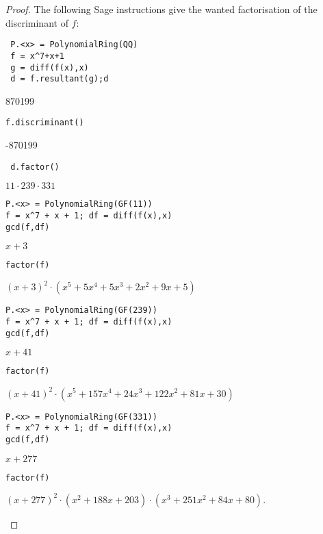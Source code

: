 \documentclass[11pt,a4paper]{article}
\begin{document}
\begin{proof}
The following Sage instructions give the wanted factorisation of the discriminant of $f$:
\begin{verbatim}
 P.<x> = PolynomialRing(QQ)
 f = x^7+x+1
 g = diff(f(x),x)
 d = f.resultant(g);d
\end{verbatim}
\begin{center}
870199
\end{center}
\begin{verbatim}
f.discriminant()
\end{verbatim}
\begin{center}
-870199
\end{center}
\begin{verbatim}
 d.factor()
\end{verbatim}
\begin{center}
$11 \cdot 239 \cdot 331$
\end{center}

\begin{verbatim}
P.<x> = PolynomialRing(GF(11))
f = x^7 + x + 1; df = diff(f(x),x)
gcd(f,df)
\end{verbatim}
\begin{center}
$x+3$
\end{center}
\begin{verbatim}
factor(f)
\end{verbatim}
\begin{center}
$(x + 3)^{2} \cdot (x^{5} + 5 x^{4} + 5 x^{3} + 2 x^{2} + 9 x + 5)$
\end{center}

\begin{verbatim}
P.<x> = PolynomialRing(GF(239))
f = x^7 + x + 1; df = diff(f(x),x)
gcd(f,df)
\end{verbatim}
\begin{center}
$x+41$
\end{center}
\begin{verbatim}
factor(f)
\end{verbatim}
\begin{center}
$(x + 41)^{2} \cdot (x^{5} + 157 x^{4} + 24 x^{3} + 122 x^{2} + 81 x + 30)$
\end{center}

\begin{verbatim}
P.<x> = PolynomialRing(GF(331))
f = x^7 + x + 1; df = diff(f(x),x)
gcd(f,df)
\end{verbatim}
\begin{center}
$x+277$
\end{center}
\begin{verbatim}
factor(f)
\end{verbatim}
\begin{center}
$(x + 277)^{2} \cdot (x^{2} + 188 x + 203) \cdot (x^{3} + 251 x^{2} + 84x + 80).$
\end{center}


\end{proof}
\end{document}
